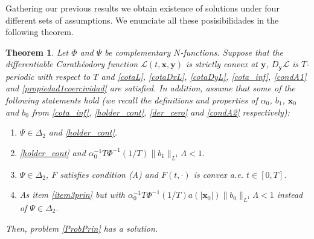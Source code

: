 \documentclass[twoside]{elsarticle}
\newtheorem{thm}{Theorem}[section]
\theoremstyle{remark}
\renewcommand{\b}[1]{\boldsymbol{#1}}
\begin{document}
Gathering our previous results we obtain existence of solutions under four different sets of assumptions. We enunciate all these posisibilidades in the following theorem. 

\begin{thm} 
Let $\Phi$ and $\Psi$ be complementary $N$-functions. 
Suppose that the differentiable Carath\'eodory function $\mathcal{L}(t,\b{x},\b{y})$ is strictly convex at $\b{y}$, $D_{\b{y}}\mathcal{L}$ is $T$-periodic with respect to $T$  and \eqref{cotaL}, \eqref{cotaDxL}, \eqref{cotaDyL}, \eqref{cota_inf}, \eqref{condA1} and \eqref{propiedad1coercividad} are satisfied. In addition, assume that some of the following statements hold (we recall the definitions and properties of $\alpha_0$, $b_1$, $\b{x}_0$ and $b_0$ from \eqref{cota_inf}, \eqref{holder_cont}, \eqref{der_cero} and \eqref{condA2} respectively):
\begin{enumerate}
  \item\label{item1prin} $\Psi\in\Delta_2$ and  \eqref{holder_cont}.
\item \eqref{holder_cont} and  $\alpha_0^{-1}T\Phi^{-1}\left(1/T\right)\|b_1\|_{L^1}\Lambda<1$.

\item\label{item3prin} $\Psi\in\Delta_2$,  $F$ satisfies condition (A) and  $F(t,\cdot)$ is  convex  a.e. $t\in [0,T]$.

\item\label{item4prin} As item \ref{item3prin} but with $\alpha_0^{-1}T\Phi^{-1}\left(1/T\right)a(|\b{x}_0|)\|b_0\|_{L^1} \Lambda<1$ instead of $\Psi\in\Delta_2$.

\end{enumerate}
Then, problem \eqref{ProbPrin} has a solution.
\end{thm}
\end{document}
